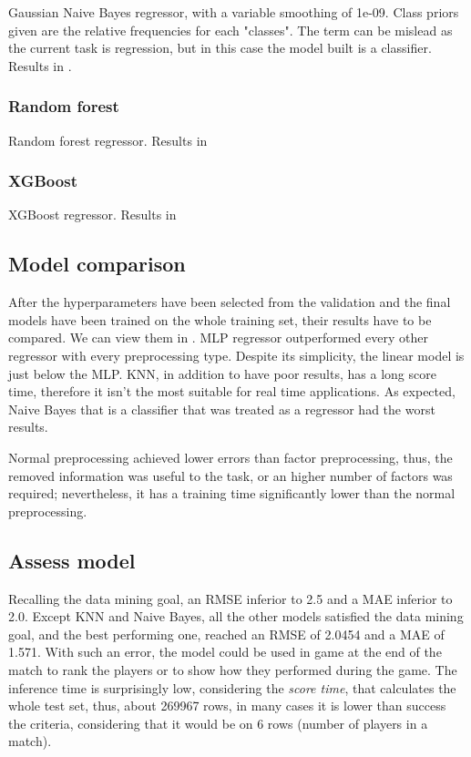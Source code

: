 Gaussian Naive Bayes regressor, with a variable smoothing of 1e-09. Class priors given are the relative frequencies for each "classes". The term can be mislead as the current task is regression, but in this case the model built is a classifier.
Results in .




\subsubsection{Random forest}

Random forest regressor.
Results in 




\subsubsection{XGBoost}

XGBoost regressor.
Results in 



\subsection{Model comparison}

After the hyperparameters have been selected from the validation and the final models have been trained on the whole training set, their results have to be compared. We can view them in .
MLP regressor outperformed every other regressor with every preprocessing type. Despite its simplicity, the linear model is just below the MLP. KNN, in addition to have poor results, has a long score time, therefore it isn't the most suitable for real time applications. As expected, Naive Bayes that is a classifier that was treated as a regressor had the worst results.

Normal preprocessing achieved lower errors than factor preprocessing, thus, the removed information was useful to the task, or an higher number of factors was required; nevertheless, it has a training time significantly lower than the normal preprocessing. 



\subsection{Assess model}

Recalling the data mining goal, an RMSE inferior to 2.5 and a MAE inferior to 2.0. Except KNN and Naive Bayes, all the other models satisfied the data mining goal, and the best performing one, reached an RMSE of 2.0454 and a MAE of 1.571. With such an error, the model could be used in game at the end of the match to rank the players or to show how they performed during the game.
The inference time is surprisingly low, considering the \textit{score time}, that calculates the whole test set, thus, about 269967 rows, in many cases it is lower than success the criteria, considering that it would be on 6 rows (number of players in a match).